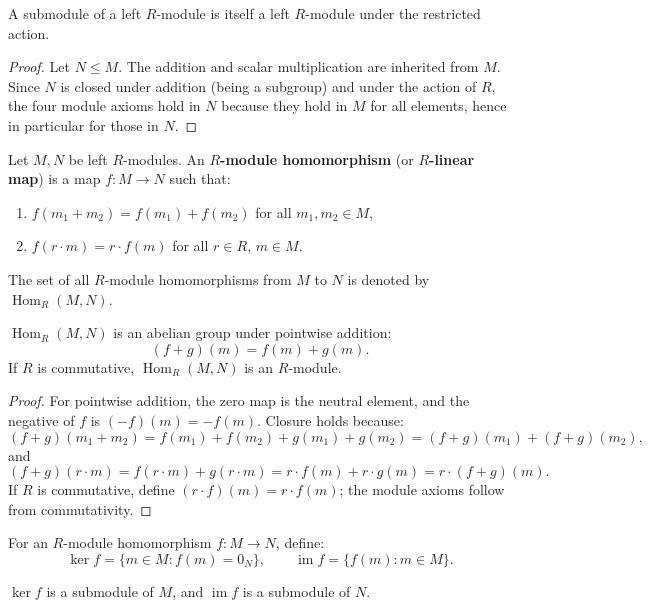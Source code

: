 \begin{prop}
A submodule of a left $R$-module is itself a left $R$-module under the restricted action.
\end{prop}

\begin{proof}
Let $N \le M$. The addition and scalar multiplication are inherited from $M$. Since $N$ is closed under addition (being a subgroup) and under the action of $R$, the four module axioms hold in $N$ because they hold in $M$ for all elements, hence in particular for those in $N$.
\end{proof}

\begin{defn}
Let $M, N$ be left $R$-modules. An \textbf{$R$-module homomorphism} (or \textbf{$R$-linear map}) is a map $f: M \to N$ such that:
\begin{enumerate}
    \item $f(m_1 + m_2) = f(m_1) + f(m_2)$ for all $m_1, m_2 \in M$,
    \item $f(r \cdot m) = r \cdot f(m)$ for all $r \in R$, $m \in M$.
\end{enumerate}
The set of all $R$-module homomorphisms from $M$ to $N$ is denoted by $\operatorname{Hom}_R(M, N)$.
\end{defn}

\begin{prop}
$\operatorname{Hom}_R(M, N)$ is an abelian group under pointwise addition:
\[
(f + g)(m) = f(m) + g(m).
\]
If $R$ is commutative, $\operatorname{Hom}_R(M, N)$ is an $R$-module.
\end{prop}

\begin{proof}
For pointwise addition, the zero map is the neutral element, and the negative of $f$ is $(-f)(m) = -f(m)$. Closure holds because:
\[
(f+g)(m_1+m_2) = f(m_1)+f(m_2)+g(m_1)+g(m_2) = (f+g)(m_1) + (f+g)(m_2),
\]
and
\[
(f+g)(r \cdot m) = f(r \cdot m) + g(r \cdot m) = r \cdot f(m) + r \cdot g(m) = r \cdot (f+g)(m).
\]
If $R$ is commutative, define $(r \cdot f)(m) = r \cdot f(m)$; the module axioms follow from commutativity.
\end{proof}

\begin{defn}
For an $R$-module homomorphism $f: M \to N$, define:
\[
\ker f = \{ m \in M : f(m) = 0_N \}, \qquad \operatorname{im} f = \{ f(m) : m \in M \}.
\]
\end{defn}

\begin{prop}
$\ker f$ is a submodule of $M$, and $\operatorname{im} f$ is a submodule of $N$.
\end{prop}

